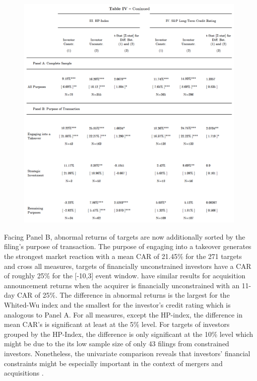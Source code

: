 \documentclass[12pt]{article}
\begin{document}
\pagebreak


\begin{figure}[!htb]
	\centering
	\begin{adjustbox}{width=\textwidth}
		\includegraphics{Measures}
	\end{adjustbox}
\end{figure}


Facing Panel B, abnormal returns of targets are now additionally sorted by the filing's purpose of transaction. The purpose of engaging into a takeover generates the strongest market reaction with a mean CAR of 21.45\% for the 271 targets and cross all measures, targets of financially unconstrained investors have a CAR of roughly 25\% for the [-10,3] event window. \citet[p.112]{Khatami2014} have similar results for acquisition announcement returns when the acquirer is financially unconstrained with an 11-day CAR of 25\%. The difference in abnormal returns is the largest for the Whited-Wu index and the smallest for the investor's credit rating which is analogous to Panel A. For all measures, except the HP-index, the difference in mean CAR's is significant at least at the 5\% level. For targets of investors grouped by the HP-Index, the difference is only significant at the 10\% level which might be due to the its low sample size of only 43 filings from constrained investors. Nonetheless, the univariate comparison reveals that investors' financial constraints might be especially important in the context of mergers and acquisitions \citep[p.112]{Khatami2014}.  
\end{document}

